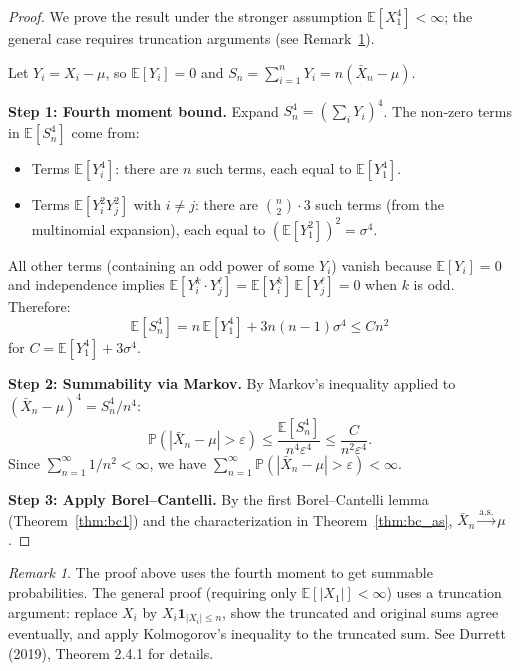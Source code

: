 \documentclass[11pt,a4paper]{article}
\theoremstyle{definition}
\theoremstyle{plain}
\theoremstyle{remark}
\newtheorem{remark}{Remark}[section]
\newcommand{\E}{\mathbb{E}}
\newcommand{\Prob}{\mathbb{P}}
\newcommand{\indicator}{\mathbf{1}}
\newcommand{\cas}{\xrightarrow{\text{a.s.}}}
\begin{document}
\begin{proof}
We prove the result under the stronger assumption $\E[X_1^4] < \infty$; the general case requires truncation arguments (see Remark~\ref{rem:slln_general}).

Let $Y_i = X_i - \mu$, so $\E[Y_i] = 0$ and $S_n = \sum_{i=1}^n Y_i = n(\bar{X}_n - \mu)$.

\textbf{Step 1: Fourth moment bound.} Expand $S_n^4 = \left(\sum_i Y_i\right)^4$. The non-zero terms in $\E[S_n^4]$ come from:
\begin{itemize}[nosep]
    \item Terms $\E[Y_i^4]$: there are $n$ such terms, each equal to $\E[Y_1^4]$.
    \item Terms $\E[Y_i^2 Y_j^2]$ with $i \neq j$: there are $\binom{n}{2} \cdot 3$ such terms (from the multinomial expansion), each equal to $(\E[Y_1^2])^2 = \sigma^4$.
\end{itemize}
All other terms (containing an odd power of some $Y_i$) vanish because $\E[Y_i] = 0$ and independence implies $\E[Y_i^k \cdot Y_j^\ell] = \E[Y_i^k]\,\E[Y_j^\ell] = 0$ when $k$ is odd. Therefore:
\begin{equation}
    \E[S_n^4] = n\,\E[Y_1^4] + 3n(n-1)\sigma^4 \leq Cn^2
    \label{eq:slln_fourth}
\end{equation}
for $C = \E[Y_1^4] + 3\sigma^4$.

\textbf{Step 2: Summability via Markov.} By Markov's inequality applied to $(\bar{X}_n - \mu)^4 = S_n^4 / n^4$:
\begin{equation}
    \Prob(|\bar{X}_n - \mu| > \varepsilon) \leq \frac{\E[S_n^4]}{n^4 \varepsilon^4} \leq \frac{C}{n^2 \varepsilon^4}.
\end{equation}
Since $\sum_{n=1}^\infty 1/n^2 < \infty$, we have $\sum_{n=1}^\infty \Prob(|\bar{X}_n - \mu| > \varepsilon) < \infty$.

\textbf{Step 3: Apply Borel--Cantelli.} By the first Borel--Cantelli lemma (Theorem~\ref{thm:bc1}) and the characterization in Theorem~\ref{thm:bc_as}, $\bar{X}_n \cas \mu$.
\end{proof}

\begin{remark}
\label{rem:slln_general}
The proof above uses the fourth moment to get summable probabilities. The general proof (requiring only $\E[|X_1|] < \infty$) uses a truncation argument: replace $X_i$ by $X_i \indicator_{|X_i| \leq n}$, show the truncated and original sums agree eventually, and apply Kolmogorov's inequality to the truncated sum. See Durrett (2019), Theorem 2.4.1 for details.
\end{remark}
\end{document}
